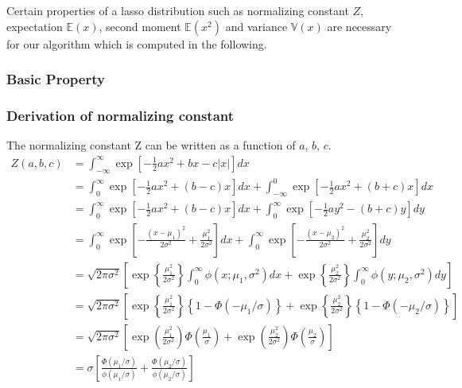 Certain properties of a lasso distribution such as normalizing constant $Z$, expectation $\mathbb{E}(x)$, second moment $\mathbb{E}(x^2)$ and variance $\mathbb{V}(x)$ are necessary for our algorithm which is computed in the following.

\subsubsection{Basic Property}
\subsubsection{Derivation of normalizing constant}
The normalizing constant Z can be written as a function of $a$, $b$, $c$.
$$
\begin{array}{rl}
	Z(a,b,c)
	&  = \int_{-\infty}^\infty \exp\left[ -\tfrac{1}{2}ax^2 + bx - c|x| \right] dx
	\\ [2ex]
	&  
	= \int_0^\infty    \exp\left[ -\tfrac{1}{2}ax^2 + (b - c)x \right] dx
	+ \int_{-\infty}^0 \exp\left[ -\tfrac{1}{2}ax^2 + (b + c)x \right] dx
	\\ [2ex]
	& 
	= \int_0^\infty \exp\left[ -\tfrac{1}{2}ax^2 + (b - c)x \right] dx
	+ \int_0^\infty \exp\left[ -\tfrac{1}{2}ay^2 - (b + c)y \right] dy
	\\ [2ex]
	& 
	= \int_0^\infty \exp\left[ - \frac{(x - \mu_1)^2}{2\sigma^2} + \frac{\mu_1^2}{2\sigma^2} \right] dx
	+ \int_0^\infty \exp\left[ - \frac{(x - \mu_2)^2}{2\sigma^2} + \frac{\mu_2^2}{2\sigma^2} \right] dy
	\\ [2ex]	& 
	= \sqrt{2\pi\sigma^2}
	\left[  \exp\left\{  \frac{\mu_1^2}{2\sigma^2} \right\} \int_0^\infty \phi(x;\mu_1,\sigma^2) dx
	+       \exp\left\{  \frac{\mu_2^2}{2\sigma^2} \right\} \int_0^\infty \phi(y;\mu_2,\sigma^2) dy
	\right] 
	\\ [2ex]
	& 
	= \sqrt{2\pi\sigma^2}
	\left[  \exp\left\{  \frac{\mu_1^2}{2\sigma^2} \right\} \left\{ 1 - \Phi(-\mu_1/\sigma) \right\} 
	+       \exp\left\{  \frac{\mu_2^2}{2\sigma^2} \right\} \left\{ 1 - \Phi(-\mu_2/\sigma) \right\} 
	\right] 
	\\ [2ex]
	& 
	= \sqrt{2\pi\sigma^2}
	\left[  \exp\left(  \frac{\mu_1^2}{2\sigma^2} \right) \Phi\left(\frac{\mu_1}{\sigma} \right) 
	+       \exp\left(  \frac{\mu_2^2}{2\sigma^2} \right) \Phi\left( \frac{\mu_2}{\sigma} \right)  
	\right] 
	
	
	\\ [2ex]
	& 
	= 
	\sigma \left[ \frac{\Phi(\mu_1/\sigma)}{\phi(\mu_1/\sigma)}
	+ \frac{\Phi(\mu_2/\sigma)}{\phi(\mu_2/\sigma)}  \right] 
\end{array} 
$$

